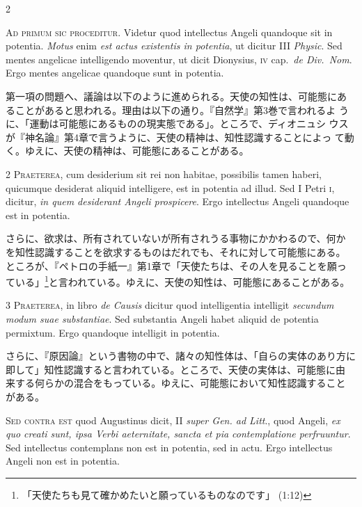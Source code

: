 \documentclass[paper=a4paper,fontsize=10pt,jafontsize=9pt,titlepage]{jlreq}
\begin{document}
\begin{paracol}{2}

{\Huge A}{\scshape d primum sic proceditur}. Videtur quod
intellectus Angeli quandoque sit in potentia. {\itshape Motus} enim {\itshape est actus
existentis in potentia}, ut dicitur III {\itshape Physic}. Sed mentes angelicae
intelligendo moventur, ut dicit Dionysius, {\scshape iv} cap.~{\itshape de Div.~Nom}. Ergo
mentes angelicae quandoque sunt in potentia.

\switchcolumn

第一項の問題へ、議論は以下のように進められる。天使の知性は、可能態にあ
ることがあると思われる。理由は以下の通り。『自然学』第3巻で言われるよ
うに、「運動は可能態にあるものの現実態である」。ところで、ディオニュシ
ウスが『神名論』第4章で言うように、天使の精神は、知性認識することによっ
て動く。ゆえに、天使の精神は、可能態にあることがある。

\switchcolumn*

{\scshape 2 Praeterea}, cum desiderium sit rei non
habitae, possibilis tamen haberi, quicumque desiderat aliquid
intelligere, est in potentia ad illud. Sed I Petri {\scshape i}, dicitur, {\itshape in quem
desiderant Angeli prospicere}. Ergo intellectus Angeli quandoque est in
potentia.

\switchcolumn

さらに、欲求は、所有されていないが所有されうる事物にかかわるので、何か
を知性認識することを欲求するものはだれでも、それに対して可能態にある。
ところが、『ペトロの手紙一』第1章で「天使たちは、その人を見ることを願っ
ている」\footnote{「天使たちも見て確かめたいと願っているものなのです」
(1:12)}と言われている。ゆえに、天使の知性は、可能態にあることがある。

\switchcolumn*

{\scshape 3 Praeterea}, in libro {\itshape de Causis} dicitur quod
intelligentia intelligit {\itshape secundum modum suae substantiae}. Sed substantia
Angeli habet aliquid de potentia permixtum. Ergo quandoque intelligit in
potentia.

\switchcolumn

さらに、『原因論』という書物の中で、諸々の知性体は、「自らの実体のあり方に
即して」知性認識すると言われている。ところで、天使の実体は、可能態に由
来する何らかの混合をもっている。ゆえに、可能態において知性認識すること
がある。

\switchcolumn*

{\scshape Sed contra est} quod Augustinus dicit, II
{\itshape super Gen. ad Litt}., quod Angeli, {\itshape ex quo creati sunt, ipsa Verbi
aeternitate, sancta et pia contemplatione perfruuntur}. Sed intellectus
contemplans non est in potentia, sed in actu. Ergo intellectus Angeli
non est in potentia.


\end{paracol}
\end{document}
